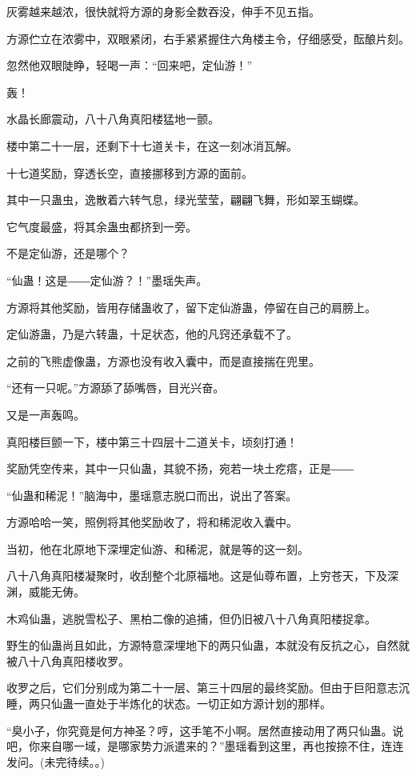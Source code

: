 \begin{this_body}
灰雾越来越浓，很快就将方源的身影全数吞没，伸手不见五指。

方源伫立在浓雾中，双眼紧闭，右手紧紧握住六角楼主令，仔细感受，酝酿片刻。

忽然他双眼陡睁，轻喝一声：“回来吧，定仙游！”

轰！

水晶长廊震动，八十八角真阳楼猛地一颤。

楼中第二十一层，还剩下十七道关卡，在这一刻冰消瓦解。

十七道奖励，穿透长空，直接挪移到方源的面前。

其中一只蛊虫，逸散着六转气息，绿光莹莹，翩翩飞舞，形如翠玉蝴蝶。

它气度最盛，将其余蛊虫都挤到一旁。

不是定仙游，还是哪个？

“仙蛊！这是――定仙游？！”墨瑶失声。

方源将其他奖励，皆用存储蛊收了，留下定仙游蛊，停留在自己的肩膀上。

定仙游蛊，乃是六转蛊，十足状态，他的凡窍还承载不了。

之前的飞熊虚像蛊，方源也没有收入囊中，而是直接揣在兜里。

“还有一只呢。”方源舔了舔嘴唇，目光兴奋。

又是一声轰鸣。

真阳楼巨颤一下，楼中第三十四层十二道关卡，顷刻打通！

奖励凭空传来，其中一只仙蛊，其貌不扬，宛若一块土疙瘩，正是――

“仙蛊和稀泥！”脑海中，墨瑶意志脱口而出，说出了答案。

方源哈哈一笑，照例将其他奖励收了，将和稀泥收入囊中。

当初，他在北原地下深埋定仙游、和稀泥，就是等的这一刻。

八十八角真阳楼凝聚时，收刮整个北原福地。这是仙尊布置，上穷苍天，下及深渊，威能无俦。

木鸡仙蛊，逃脱雪松子、黑柏二像的追捕，但仍旧被八十八角真阳楼捉拿。

野生的仙蛊尚且如此，方源特意深埋地下的两只仙蛊，本就没有反抗之心，自然就被八十八角真阳楼收罗。

收罗之后，它们分别成为第二十一层、第三十四层的最终奖励。但由于巨阳意志沉睡，两只仙蛊一直处于半炼化的状态。一切正如方源计划的那样。

“臭小子，你究竟是何方神圣？哼，这手笔不小啊。居然直接动用了两只仙蛊。说吧，你来自哪一域，是哪家势力派遣来的？”墨瑶看到这里，再也按捺不住，连连发问。(未完待续。。)

\end{this_body}

